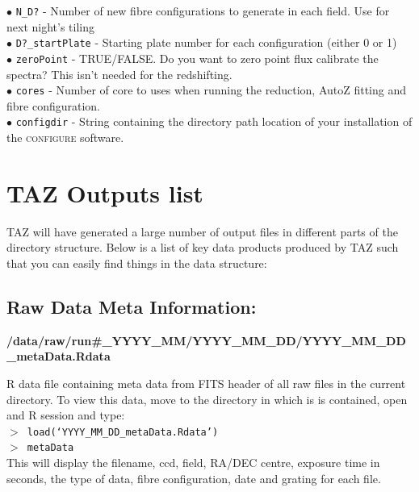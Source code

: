 \documentclass[12pt]{article}
\begin{document}
$\bullet$ \texttt{N\_D?} - Number of new fibre configurations to generate in each field. Use for next night's tiling\\

$\bullet$ \texttt{D?\_startPlate} - Starting plate number for each configuration (either 0 or 1)\\

$\bullet$ \texttt{zeroPoint} -  TRUE/FALSE. Do you want to zero point flux calibrate the spectra? This isn't needed for the redshifting. \\

$\bullet$ \texttt{cores} - Number of core to uses when running the reduction, AutoZ fitting and fibre configuration. \\

$\bullet$ \texttt{configdir} - String containing the directory path location of your installation of the \textsc{configure} software. 



\section{TAZ Outputs list}

TAZ will have generated a large number of output files in different parts of the directory structure. Below is a list of key data products produced by TAZ such that you can easily find things in the data structure: 

\subsection{Raw Data Meta Information:}

\textbf{/data/raw/run\#\_YYYY\_MM/YYYY\_MM\_DD/YYYY\_MM\_DD\_metaData.Rdata} 

R data file containing meta data from FITS header of all raw files in the current directory. To view this data, move to the directory in which is is contained, open and R session and type: \\

\hspace{10mm}  \texttt{$>$ load(`YYYY\_MM\_DD\_metaData.Rdata')}\\

\hspace{10mm}  \texttt{$>$ metaData}\\
  
 
 This will display the filename, ccd, field, RA/DEC centre, exposure time in seconds, the type of data, fibre configuration, date and grating for each file.  
\end{document}
